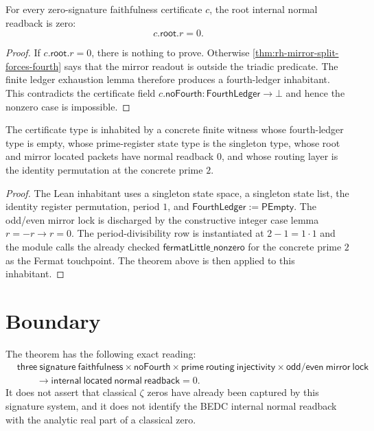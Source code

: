 \begin{theorem}
\label{thm:rh-located-defect-is-zero}
For every zero-signature faithfulness certificate $c$, the root internal
normal readback is zero:
$$
c.\mathsf{root}.r=0.
$$
\end{theorem}

\begin{proof}
If $c.\mathsf{root}.r=0$, there is nothing to prove. Otherwise
\autoref{thm:rh-mirror-split-forces-fourth} says that the mirror readout
is outside the triadic predicate. The finite ledger exhaustion lemma
therefore produces a fourth-ledger inhabitant. This contradicts the
certificate field
$
c.\mathsf{noFourth}:\mathsf{FourthLedger}\to\bot
$
and hence the nonzero case is impossible.
\end{proof}

\begin{theorem}
\label{thm:rh-canonical-zero-signature-faithfulness}
The certificate type is inhabited by a concrete finite witness whose
fourth-ledger type is empty, whose prime-register state type is the
singleton type, whose root and mirror located packets have normal readback
$0$, and whose routing layer is the identity permutation at the concrete
prime $2$.
\end{theorem}

\begin{proof}
The Lean inhabitant uses a singleton state space, a singleton state list,
the identity register permutation, period $1$, and
$\mathsf{FourthLedger}:=\mathsf{PEmpty}$. The odd/even mirror lock is
discharged by the constructive integer case lemma
$
r=-r\to r=0
$.
The period-divisibility row is instantiated at $2-1=1\cdot 1$ and the
module calls the already checked
$
\mathsf{fermatLittle\_nonzero}
$
for the concrete prime $2$ as the Fermat touchpoint. The theorem above is
then applied to this inhabitant.
\end{proof}

\section{Boundary}
\label{sec:rh-zero-signature-faithfulness-boundary}

The theorem has the following exact reading:
$$
\begin{aligned}
&\mathsf{three\ signature\ faithfulness}
\times
\mathsf{noFourth}
\times
\mathsf{prime\ routing\ injectivity}
\times
\mathsf{odd/even\ mirror\ lock}
\\
&\qquad\to
\mathsf{internal\ located\ normal\ readback}=0.
\end{aligned}
$$
It does not assert that classical $\zeta$ zeros have already been captured
by this signature system, and it does not identify the BEDC internal
normal readback with the analytic real part of a classical zero.

